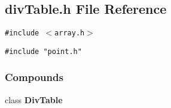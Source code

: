 \subsection{div\-Table.h File Reference}
\label{divTable.h}
{\tt \#include $<$array.h$>$}\par
{\tt \#include "point.h"}\par
\subsubsection*{Compounds}
\begin{CompactItemize}
\item 
class {\bf Div\-Table}
\end{CompactItemize}
